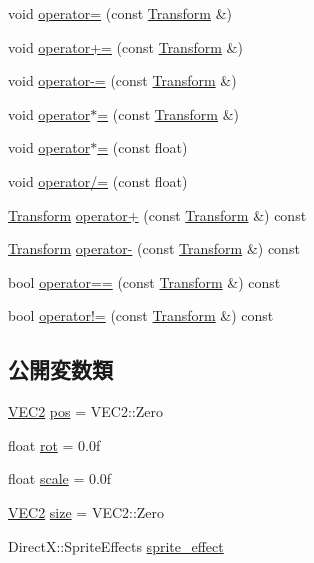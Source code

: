 \begin{DoxyCompactItemize}
void \mbox{\hyperlink{class_transform_af1a25489903986022218a798e4f40251}{operator=}} (const \mbox{\hyperlink{class_transform}{Transform}} \&)
\item 
void \mbox{\hyperlink{class_transform_a3b0aa54a1ca373ec3a7052977b5bf826}{operator+=}} (const \mbox{\hyperlink{class_transform}{Transform}} \&)
\item 
void \mbox{\hyperlink{class_transform_a204ee3471c1d08188076e3645c9f3517}{operator-\/=}} (const \mbox{\hyperlink{class_transform}{Transform}} \&)
\item 
void \mbox{\hyperlink{class_transform_a3746d6759ca289e8cd4982e889e7ec6b}{operator$\ast$=}} (const \mbox{\hyperlink{class_transform}{Transform}} \&)
\item 
void \mbox{\hyperlink{class_transform_ab13378f63abf5bc132841f83423a634d}{operator$\ast$=}} (const float)
\item 
void \mbox{\hyperlink{class_transform_aa38455bbe5aed5f9dfd98a8d3b8a24ec}{operator/=}} (const float)
\item 
\mbox{\hyperlink{class_transform}{Transform}} \mbox{\hyperlink{class_transform_a8e21c258146adde8ca798878bab9ce9d}{operator+}} (const \mbox{\hyperlink{class_transform}{Transform}} \&) const
\item 
\mbox{\hyperlink{class_transform}{Transform}} \mbox{\hyperlink{class_transform_a17493155309aa1650de99ce384f096a6}{operator-\/}} (const \mbox{\hyperlink{class_transform}{Transform}} \&) const
\item 
bool \mbox{\hyperlink{class_transform_a0a2d49f8c1b9a2229846534f9bcc63d4}{operator==}} (const \mbox{\hyperlink{class_transform}{Transform}} \&) const
\item 
bool \mbox{\hyperlink{class_transform_ae0aed78dcd6aaeb786ec0bdadafa9498}{operator!=}} (const \mbox{\hyperlink{class_transform}{Transform}} \&) const
\end{DoxyCompactItemize}
\subsection*{公開変数類}
\begin{DoxyCompactItemize}
\item 
\mbox{\hyperlink{common_8h_afb0c5e21d4133ff4f200992c0b534e1b}{V\+E\+C2}} \mbox{\hyperlink{class_transform_a25bce2389cc280e8adf193bdbb00d94a}{pos}} = V\+E\+C2\+::\+Zero
\item 
float \mbox{\hyperlink{class_transform_a2b471ae0000c6959dc9b07263933aa43}{rot}} = 0.\+0f
\item 
float \mbox{\hyperlink{class_transform_a631712eb230305f58d164086d492701b}{scale}} = 0.\+0f
\item 
\mbox{\hyperlink{common_8h_afb0c5e21d4133ff4f200992c0b534e1b}{V\+E\+C2}} \mbox{\hyperlink{class_transform_a83e0bdbf8a2b4a45197d17d7415a6874}{size}} = V\+E\+C2\+::\+Zero
\item 
Direct\+X\+::\+Sprite\+Effects \mbox{\hyperlink{class_transform_aef779df24fb3283f179950f9594b9fd4}{sprite\+\_\+effect}}
\end{DoxyCompactItemize}


